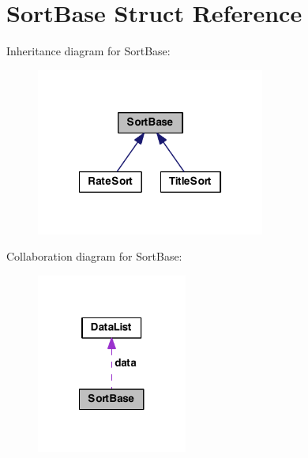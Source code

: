 \hypertarget{struct_sort_base}{\section{Sort\-Base Struct Reference}
\label{struct_sort_base}
}


Inheritance diagram for Sort\-Base\-:
\nopagebreak
\begin{figure}[H]
\begin{center}
\leavevmode
\includegraphics[width=213pt]{struct_sort_base__inherit__graph}
\end{center}
\end{figure}


Collaboration diagram for Sort\-Base\-:
\nopagebreak
\begin{figure}[H]
\begin{center}
\leavevmode
\includegraphics[width=140pt]{struct_sort_base__coll__graph}
\end{center}
\end{figure}
